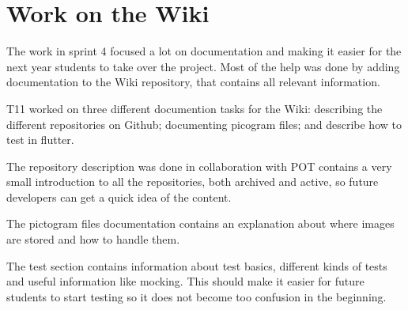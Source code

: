 \section{Work on the Wiki}
The work in sprint 4 focused a lot on documentation and making it easier for the next year students to take over the project. Most of the help was done by adding documentation to the Wiki repository, that contains all relevant information. 

\gls{T11} worked on three different documention tasks for the Wiki: describing the different repositories on Github; documenting picogram files; and describe how to test in flutter. 

The repository description was done in collaboration with \gls{POT} contains a very small introduction to all the repositories, both archived and active, so future developers can get a quick idea of the content.

The pictogram files documentation contains an explanation about where images are stored and how to handle them.

The test section contains information about test basics, different kinds of tests and useful information like mocking. This should make it easier for future students to start testing so it does not become too confusion in the beginning.

